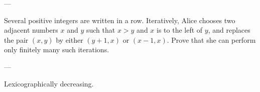 
---

Several positive integers are written in a row. Iteratively, Alice chooses two adjacent numbers $x$ and $y$ such that $x>y$ and $x$ is to the left of $y$, and replaces the pair $(x,y)$ by either $(y+1,x)$ or $(x-1,x)$. Prove that she can perform only finitely many such iterations.

---

Lexicographically decreasing.
